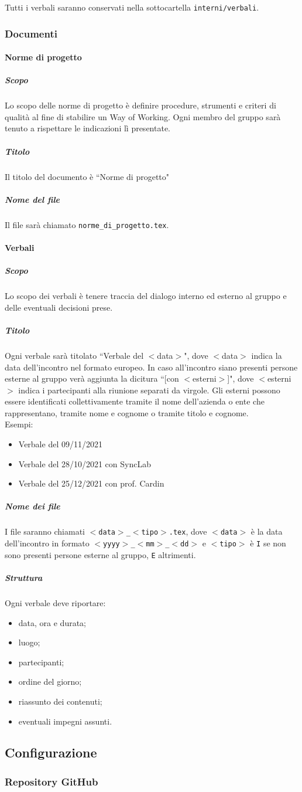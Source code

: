 \documentclass[a4paper,12pt]{article}
\begin{document}
Tutti i verbali saranno conservati nella sottocartella \texttt{interni/verbali}.


\subsubsection{Documenti}\label{documentazione-documenti}

\paragraph{Norme di progetto}
\subparagraph{Scopo}
Lo scopo delle norme di progetto è definire procedure, strumenti e criteri di qualità al fine di stabilire un Way of Working. Ogni membro del gruppo sarà tenuto a rispettare le indicazioni lì presentate.
\subparagraph{Titolo}
Il titolo del documento è ``Norme di progetto"
\subparagraph{Nome del file}
Il file sarà chiamato \texttt{norme\_di\_progetto.tex}.

\paragraph{Verbali}
\subparagraph{Scopo}
Lo scopo dei verbali è tenere traccia del dialogo interno ed esterno al gruppo e delle eventuali decisioni prese.
\subparagraph{Titolo}
Ogni verbale sarà titolato ``Verbale del $<$data$>$", dove $<$data$>$ indica la data dell'incontro nel formato europeo. In caso all'incontro siano presenti persone esterne al gruppo verà aggiunta la dicitura ``[con $<$esterni$>$]", dove $<$esterni$>$ indica i partecipanti alla riunione separati da virgole. Gli esterni possono essere identificati collettivamente tramite il nome dell'azienda o ente che rappresentano, tramite nome e cognome o tramite titolo e cognome.\\
Esempi:
\begin{itemize}
\item Verbale del 09/11/2021
\item Verbale del 28/10/2021 con SyncLab
\item Verbale del 25/12/2021 con prof. Cardin
\end{itemize}
\subparagraph{Nome dei file}
I file saranno chiamati \texttt{$<$data$>$\_$<$tipo$>$.tex}, dove \texttt{$<$data$>$} è la data dell'incontro in formato \texttt{$<$yyyy$>$\_$<$mm$>$\_$<$dd$>$} e \texttt{$<$tipo$>$} è \texttt{I} se non sono presenti persone esterne al gruppo, \texttt{E} altrimenti.
\subparagraph{Struttura}
Ogni verbale deve riportare:
\begin{itemize}
\item data, ora e durata;
\item luogo;
\item partecipanti;
\item ordine del giorno;
\item riassunto dei contenuti;
\item eventuali impegni assunti.
\end{itemize}

\subsection{Configurazione}

\subsubsection{Repository GitHub}

\end{document}
